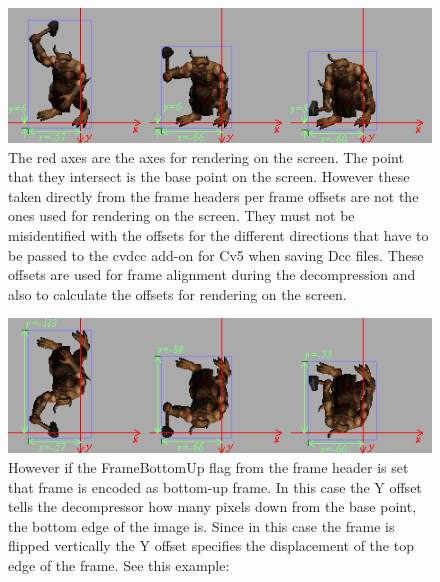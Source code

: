 \graphicspath{{./image/dcc/}}
\begin{figure}[!h]
  \includegraphics[width=\linewidth]{top.png}
  \caption{
The red axes are the axes for rendering on the screen. The point that 
they intersect is the base point on the screen. However these taken directly 
from the frame headers per frame offsets are not the ones used for rendering on 
the screen. They must not be misidentified with the offsets for the different 
directions that have to be passed to the cvdcc add-on for Cv5 when saving Dcc 
files. These offsets are used for frame alignment during the decompression and 
also to calculate the offsets for rendering on the screen.}
  \label{fig:top}
\end{figure}

\begin{figure}[!h]
  \includegraphics[width=\linewidth]{bottom.png}
  \caption{
However if the FrameBottomUp flag from the frame header is set that frame is 
encoded as bottom-up frame. In this case the Y offset tells the decompressor 
how many pixels down from the base point, the bottom edge of the image is. Since 
in this case the frame is flipped vertically the Y offset specifies the 
displacement of the top edge of the frame. See this example:
}
  \label{fig:bottom}
\end{figure}

